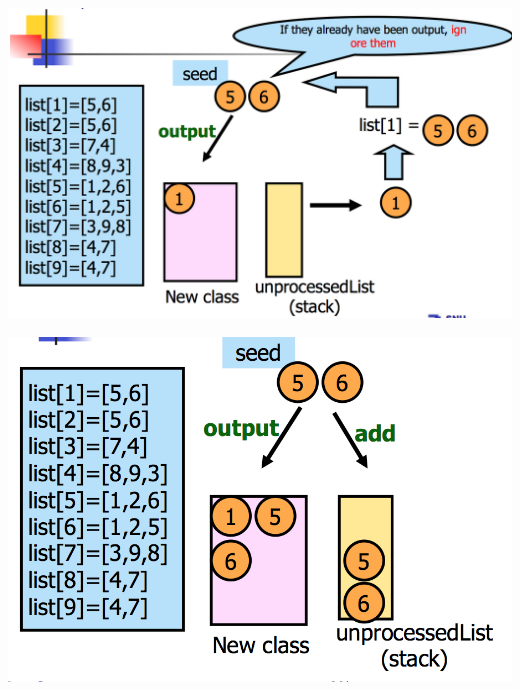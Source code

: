 \documentclass[a4paper,11pt,twoside]{book}
\begin{document}
\begin{minipage}{.5\textwidth}	
	\includegraphics[scale=0.35]{pics/offline_3.png} 
\end{minipage}
\begin{minipage}{.5\textwidth}	
	\includegraphics[scale=0.35]{pics/offline_4.png}  
\end{minipage}
\end{document}
